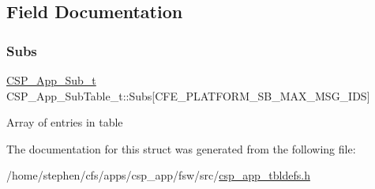 \subsection{Field Documentation}
\mbox{\label{structCSP__App__SubTable__t_a5a681cdd91bf7ea81d12241f3edd335b}} 
\subsubsection{\texorpdfstring{Subs}{Subs}}
{\footnotesize\ttfamily \hyperlink{structCSP__App__Sub__t}{C\+S\+P\+\_\+\+App\+\_\+\+Sub\+\_\+t} C\+S\+P\+\_\+\+App\+\_\+\+Sub\+Table\+\_\+t\+::\+Subs\mbox{[}C\+F\+E\+\_\+\+P\+L\+A\+T\+F\+O\+R\+M\+\_\+\+S\+B\+\_\+\+M\+A\+X\+\_\+\+M\+S\+G\+\_\+\+I\+DS\mbox{]}}

Array of entries in table 

The documentation for this struct was generated from the following file\+:\begin{DoxyCompactItemize}
\item 
/home/stephen/cfs/apps/csp\+\_\+app/fsw/src/\hyperlink{csp__app__tbldefs_8h}{csp\+\_\+app\+\_\+tbldefs.\+h}\end{DoxyCompactItemize}
